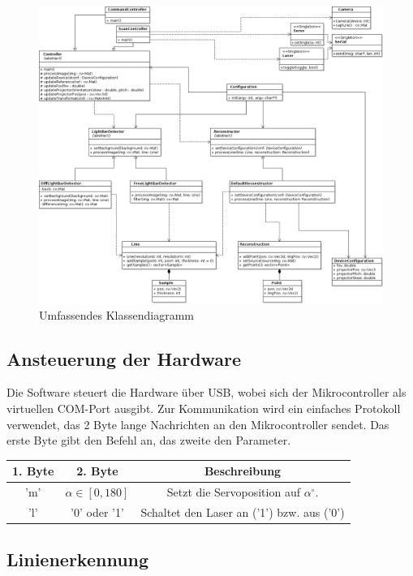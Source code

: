 \documentclass[ngerman,a4paper,parskip=half]{scrartcl}
\begin{document}
\begin{figure}
	\centering
	\includegraphics[width=\linewidth]{includes/classdiagram}
	\caption{Umfassendes Klassendiagramm}
	\label{fig:classes_all}
\end{figure}

\subsection{Ansteuerung der Hardware}

Die Software steuert die Hardware über USB, wobei sich der Mikrocontroller als virtuellen COM-Port ausgibt. Zur Kommunikation wird ein einfaches Protokoll verwendet, das 2 Byte lange Nachrichten an den Mikrocontroller sendet. Das erste Byte gibt den Befehl an, das zweite den Parameter.\\

\begin{tabular}{|c|c|c|}
\hline
1. Byte & 2. Byte & Beschreibung \\
\hline
'm'\footnotemark & $\alpha \in [0,180]$ & Setzt die Servoposition auf $\alpha ^\circ$.\\
\hline
'l' & '0' oder '1' & Schaltet den Laser an ('1') bzw. aus ('0')\\
\hline
\end{tabular}



\subsection{Linienerkennung}
\end{document}
